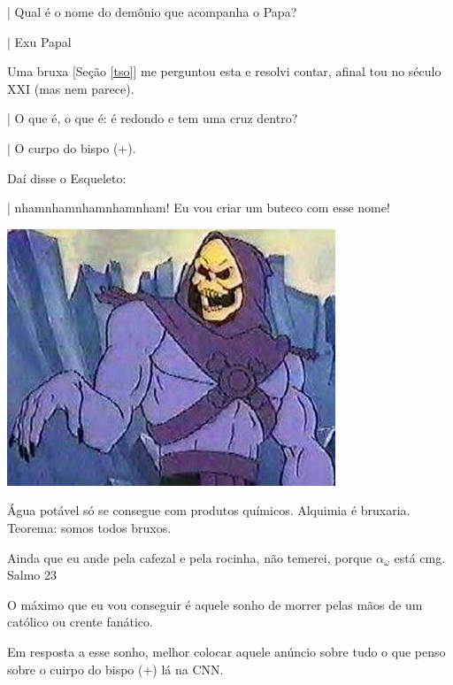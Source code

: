 \documentclass[12pt,a4paper]{article}
\begin{document}
		| Qual \'e o nome do dem\^onio\cite{x} que acompanha o Papa?

		| Exu Papal

		\begin{flushright}
		\end{flushright}

		Uma bruxa [Se\c{c}\~ao \ref{tso}] me perguntou esta e resolvi contar, afinal tou no s\'eculo XXI (mas nem parece).

		| O que \'e, o que \'e: \'e redondo e tem uma cruz dentro?

		| O curpo do bispo (+).

		Da\'i disse o Esqueleto:

		| nhamnhamnhamnhamnham! Eu vou criar um buteco com esse nome!

		\begin{center}
		\includegraphics{skeletor}
		\end{center}

		\begin{flushright}
		\end{flushright}

\'Agua pot\'avel s\'o se consegue com produtos qu\'imicos. Alquimia \'e bruxaria. Teorema:  somos todos bruxos.

		\begin{flushright}
		\end{flushright}

		Ainda que eu ande pela cafezal e pela rocinha, n\~ao temerei, porque $ \alpha_\omega $ est\'a cmg. Salmo 23\cite{x}

		O m\'aximo que eu vou conseguir \'e aquele sonho\cite{sonho} de morrer pelas m\~aos de um cat\'olico\cite{x} ou crente fan\'atico\cite{x}.

		Em resposta a esse sonho, melhor colocar aquele an\'uncio sobre tudo o que penso sobre o cuirpo do bispo\cite{x} (+) l\'a na CNN\cite{x}.
\end{document}

